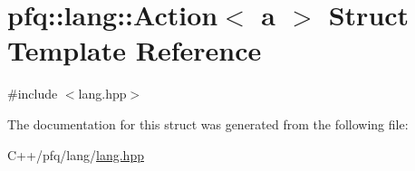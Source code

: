 \hypertarget{structpfq_1_1lang_1_1Action}{}\section{pfq\+:\+:lang\+:\+:Action$<$ a $>$ Struct Template Reference}
\label{structpfq_1_1lang_1_1Action}


{\ttfamily \#include $<$lang.\+hpp$>$}



The documentation for this struct was generated from the following file\+:\begin{DoxyCompactItemize}
\item 
C++/pfq/lang/\hyperlink{lang_8hpp}{lang.\+hpp}\end{DoxyCompactItemize}
